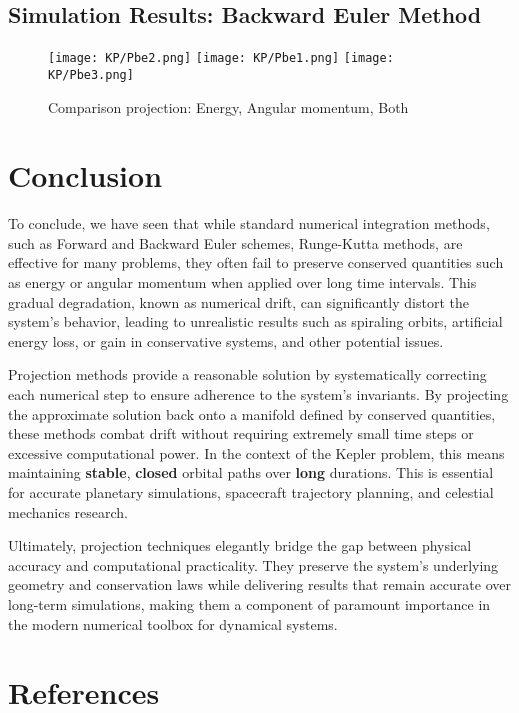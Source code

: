 \documentclass[11pt]{article}
\begin{document}
\subsection{Simulation Results: Backward Euler Method}

\begin{figure}[H]
  \centering
  \texttt{[image: KP/Pbe2.png]} \hfill
  \texttt{[image: KP/Pbe1.png]} \hfill
  \texttt{[image: KP/Pbe3.png]} 
  \caption{Comparison projection: Energy, Angular momentum, Both}
  \label{fig:three-in-line}
\end{figure}



\clearpage

\section{Conclusion}
To conclude, we have seen that while standard numerical integration methods, such as Forward and Backward Euler schemes, Runge-Kutta methods, are effective for many problems, they often fail to preserve conserved quantities such as energy or angular momentum when applied over long time intervals. This gradual degradation, known as numerical drift, can significantly distort the system’s behavior, leading to unrealistic results such as spiraling orbits, artificial energy loss, or gain in conservative systems, and other potential issues.

Projection methods provide a reasonable solution by systematically correcting each numerical step to ensure adherence to the system’s invariants. By projecting the approximate solution back onto a manifold defined by conserved quantities, these methods combat drift without requiring extremely small time steps or excessive computational power. In the context of the Kepler problem, this means maintaining \textbf{stable}, \textbf{closed} orbital paths over \textbf{long} durations. This is essential for accurate planetary simulations, spacecraft trajectory planning, and celestial mechanics research.

Ultimately, projection techniques elegantly bridge the gap between physical accuracy and computational practicality. They preserve the system’s underlying geometry and conservation laws while delivering results that remain accurate over long-term simulations, making them a component of paramount importance in the modern numerical toolbox for dynamical systems.

\section{References}
\end{document}
